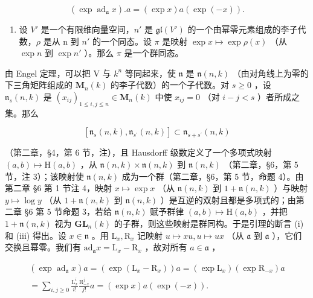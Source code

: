 \[
(\exp \operatorname{ad} _ {\mathfrak {a}} x). a = (\exp x) a (\exp (- x)).
\]

\begin{enumerate}
\def\labelenumi{(\roman{enumi})}
\setcounter{enumi}{2}
\tightlist
\item
  设 \(V'\) 是一个有限维向量空间，\(n'\) 是 \(\mathfrak{gl}(V')\) 的一个由幂零元素组成的李子代数，\(\rho\) 是从 n 到 \(n'\) 的一个同态。设 \(\pi\) 是映射 \(\exp x \mapsto \exp \rho(x)\) （从 \(\exp n\) 到 \(\exp n'\) ）。那么 \(\pi\) 是一个群同态。
\end{enumerate}

由 Engel 定理，可以把 V 与 \(k^n\) 等同起来，使 \(\mathfrak{n}\) 是 \(\mathfrak{n}(n,k)\) （由对角线上为零的下三角矩阵组成的 \(\mathbf{M}_n(k)\) 的李子代数）的一个子代数。对 \(s \geq 0\) ，设 \(\mathfrak{n}_s(n,k)\) 是 \((x_{ij})_{1 \leq i,j \leq n} \in \mathbf{M}_n(k)\) 中使 \(x_{ij} = 0\) （对 \(i - j < s\) ）者所成之集。那么

\[
[ \mathfrak {n} _ {s} (n, k), \mathfrak {n} _ {s ^ {\prime}} (n, k) ] \subset \mathfrak {n} _ {s + s ^ {\prime}} (n, k)
\]

（第二章，§4，第 6 节，注），且 Hausdorff 级数定义了一个多项式映射 \((a,b)\mapsto\mathrm{H}(a,b)\) ，从 \(\mathfrak{n}(n,k)\times\mathfrak{n}(n,k)\) 到 \(\mathfrak{n}(n,k)\) （第二章，§6，第 5 节，注 3）；该映射使 \(\mathfrak{n}(n,k)\) 成为一个群（第二章，§6，第 5 节，命题 4）。由第二章 §6 第 1 节注 4，映射 \(x\mapsto\exp x\) （从 \(\mathfrak{n}(n,k)\) 到 \(1+\mathfrak{n}(n,k)\) ）与映射 \(y\mapsto\log y\) （从 \(1+\mathfrak{n}(n,k)\) 到 \(\mathfrak{n}(n,k)\) ）是互逆的双射且都是多项式的；由第二章 §6 第 5 节命题 3，若给 \(\mathfrak{n}(n,k)\) 赋予群律 \((a,b)\mapsto\mathrm{H}(a,b)\) ，并把 \(1+\mathfrak{n}(n,k)\) 视为 \(\mathbf{GL}_{n}(k)\) 的子群，则这些映射是群同构。于是引理的断言 (i) 和 (iii) 得出。设 \(x\in\mathfrak{n}\) 。用 \(\mathrm{L}_{x},\mathrm{R}_{x}\) 记映射 \(u\mapsto xu,u\mapsto ux\) （从 \(\mathfrak{a}\) 到 \(\mathfrak{a}\) ），它们交换且幂零。我们有 \(\mathrm{ad}_{\mathfrak{a}}x=\mathrm{L}_{x}-\mathrm{R}_{x}\) ，故对所有 \(a\in\mathfrak{a}\) ，

\[
\begin{array}{c} (\exp \operatorname{ad} _ {\mathfrak {a}} x) a = (\exp (\mathrm{L} _ {x} - \mathrm{R} _ {x})) a = (\exp \mathrm{L} _ {x}) (\exp \mathrm{R} _ {- x}) a \\ = \sum_ {i, j \geq 0} \frac {\mathrm{L} _ {x} ^ {i}}{i !} \frac {\mathrm{R} _ {- x} ^ {j}}{j !} a = (\exp x) a (\exp (- x)). \end{array}\tag{1}
\]

